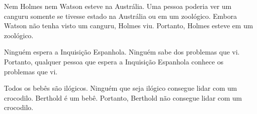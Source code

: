 \begin{compactlist}
\item Nem Holmes nem Watson esteve na Austrália. Uma pessoa poderia ver um canguru somente se tivesse estado na Austrália ou em um zoológico. Embora Watson não tenha visto um canguru, Holmes viu. Portanto, Holmes esteve em um zoológico.
\item Ninguém espera a Inquisição Espanhola. Ninguém sabe dos problemas que vi. Portanto, qualquer pessoa que espera a Inquisição Espanhola conhece os problemas que vi.
\item Todos os bebês são ilógicos. Ninguém que seja ilógico consegue lidar com um crocodilo. Berthold é um bebê. Portanto, Berthold não consegue lidar com um crocodilo.
\end{compactlist}


